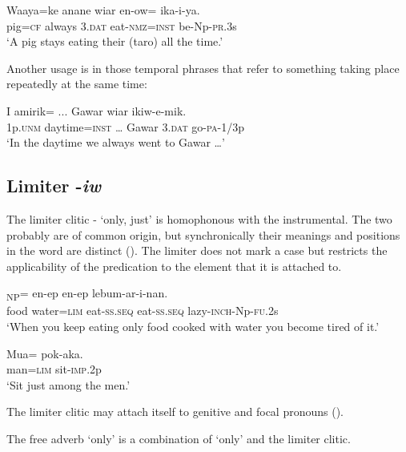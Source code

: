 \ea%
\label{ex:x774}
\gll Waaya=ke anane wiar en-ow= ika-i-ya. \\
pig=\textsc{cf} always 3.\textsc{dat} eat-\textsc{nmz}=\textsc{inst} be-Np-\textsc{pr}.3s\\
\glt`A pig stays eating their (taro) all the time.'
\z

Another usage is in those temporal phrases that refer to something taking place repeatedly at the same time: 

\ea%
\label{ex:x1882}
\gll I amirik= ... Gawar wiar ikiw-e-mik. \\
1p.\textsc{unm} daytime=\textsc{inst} {\dots} Gawar 3.\textsc{dat} go-\textsc{pa}-1/3p\\
\glt`In the daytime we always went to Gawar {\dots}'
\z

\subsection{Limiter -\textit{iw}}
{}
The limiter clitic - `only, just' is homophonous with the instrumental. The two probably are of common origin, but synchronically their meanings and positions in the word are distinct (). The limiter does not mark a case but restricts the applicability of the predication to the element that it is attached to. 

\ea%
\label{ex:x769}
\textsubscript{NP}= en-ep en-ep lebum-ar-i-nan. \\
food water=\textsc{lim} eat-\textsc{ss}.\textsc{seq} eat-\textsc{ss}.\textsc{seq} lazy-\textsc{inch}-Np-\textsc{fu}.2s\\
\glt`When you keep eating only food cooked with water you become tired of it.'
\z

\ea%
\label{ex:x772}
\gll Mua= pok-aka. \\
man=\textsc{lim} sit-\textsc{imp}.2p\\
\glt`Sit just among the men.'
\z

The limiter clitic may attach itself to genitive and focal pronouns (). 

The free adverb  `only' is a combination of  `only' and the limiter clitic.

